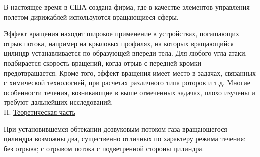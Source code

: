 \documentclass[specialist, subf, href, colorlinks=true, 14pt, final]{disser}
\theoremstyle{definition}
\newcommand{\npart}[2]{\noindent #1. \underline{#2}}
\begin{document}
В настоящее время в США создана фирма, где в качестве элементов управления полетом дирижаблей используются вращающиеся сферы.

Эффект вращения находит широкое применение в устройствах, погашающих отрыв потока, например на крыловых профилях, на которых вращающийся цилиндр устанавливается по образующей впереди тела. Для любого угла атаки, подбирается скорость вращений, когда отрыв с передней кромки предотвращается. Кроме того, эффект вращения имеет место в задачах, связанных с химической технологией, при расчетах различного типа роторов и т.д. Многие особенности течения, возникающие в выше отмеченных задачах, плохо изучены и требуют дальнейших исследований.\\

\npart{II}{Теоретическая часть}

При установившемся обтекании дозвуковым потоком газа вращающегося цилиндра возможны два, существенно отличных по характеру режима течения: без отрыва; с отрывом потока с подветренной стороны цилиндра. 
\end{document}
